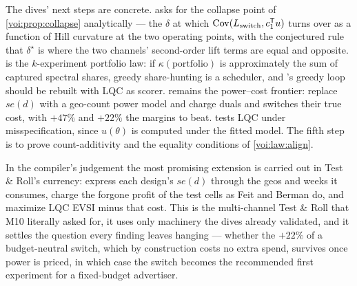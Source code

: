 The dives' next steps are concrete.  asks for the collapse point of \cref{voi:prop:collapse} analytically --- the $\delta$ at which $\operatorname{Cov}(L_{\mathrm{switch}}, c_1^{\mathsf{T}} u)$ turns over as a function of Hill curvature at the two operating points, with the conjectured rule that $\delta^\star$ is where the two channels' second-order lift terms are equal and opposite.  is the $k$-experiment portfolio law: if $\kappa(\text{portfolio})$ is approximately the sum of captured spectral shares, greedy share-hunting is a scheduler, and 's greedy loop should be rebuilt with LQC as scorer.  remains the power--cost frontier: replace $se(d)$ with a geo-count power model and charge duals and switches their true cost, with $+47\%$ and $+22\%$ the margins to beat.  tests LQC under misspecification, since $u(\theta)$ is computed under the fitted model. The fifth step is to prove count-additivity and the equality conditions of \cref{voi:law:align}.

In the compiler's judgement the most promising extension is  carried out in Test \& Roll's currency: express each design's $se(d)$ through the geos and weeks it consumes, charge the forgone profit of the test cells as Feit and Berman do, and maximize LQC EVSI minus that cost. This is the multi-channel Test \& Roll that M10 literally asked for, it uses only machinery the dives already validated, and it settles the question every finding leaves hanging --- whether the $+22\%$ of a budget-neutral switch, which by construction costs no extra spend, survives once power is priced, in which case the switch becomes the recommended first experiment for a fixed-budget advertiser.

